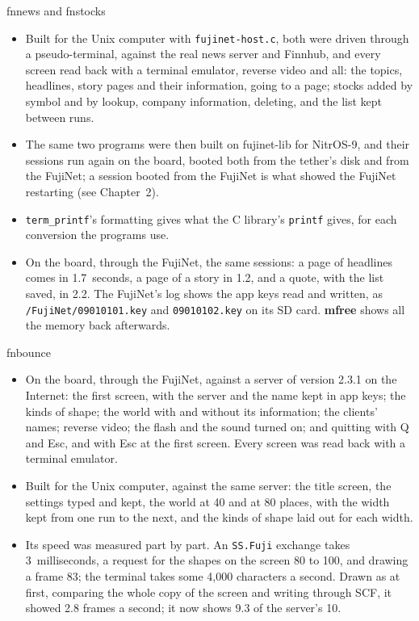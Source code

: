 \documentclass[10pt,twoside,openany]{book}
\makeatletter
\newcommand{\cmd}[1]{\textbf{#1}}            %
\newcommand{\file}[1]{\texttt{#1}}           %
\newcommand{\key}[1]{\textsf{\small #1}}     %
\renewcommand{\section}{\@startsection{section}{1}{0pt}{3.2ex plus 1ex}{1.2ex}%
  {\sffamily\bfseries\large}}
\makeatother
\begin{document}
\section{fnnews and fnstocks}

\begin{itemize}\setlength{\itemsep}{0.3ex}
\item Built for the Unix computer with \file{fujinet-host.c}, both were
driven through a pseudo-terminal, against the real news server and
Finnhub, and every screen read back with a terminal emulator, reverse
video and all: the topics, headlines, story pages and their information,
going to a page; stocks added by symbol and by lookup, company
information, deleting, and the list kept between runs.
\item The same two programs were then built on fujinet-lib for NitrOS-9,
and their sessions run again on the board, booted both from the tether's
disk and from the FujiNet; a session booted from the FujiNet is what
showed the FujiNet restarting (see Chapter~2).
\item \texttt{term\_printf}'s formatting gives what the C library's
\texttt{printf} gives, for each conversion the programs use.
\item On the board, through the FujiNet, the same sessions: a page of
headlines comes in 1.7~seconds, a page of a story in 1.2, and a quote,
with the list saved, in 2.2. The FujiNet's log shows the app keys read and
written, as \file{/FujiNet/09010101.key} and \file{09010102.key} on its
SD card. \cmd{mfree} shows all the memory back afterwards.
\end{itemize}

\section{fnbounce}

\begin{itemize}\setlength{\itemsep}{0.3ex}
\item On the board, through the FujiNet, against a server of version
2.3.1 on the Internet: the first screen, with the server and the name
kept in app keys; the kinds of shape; the world with and without its
information; the clients' names; reverse video; the flash and the sound
turned on; and quitting with \key{Q} and \key{Esc}, and with \key{Esc} at
the first screen. Every screen was read back with a terminal emulator.
\item Built for the Unix computer, against the same server: the title
screen, the settings typed and kept, the world at 40 and at 80 places,
with the width kept from one run to the next, and the kinds of shape laid
out for each width.
\item Its speed was measured part by part. An \texttt{SS.Fuji} exchange
takes 3~milliseconds, a request for the shapes on the screen 80 to 100,
and drawing a frame 83; the terminal takes some 4,000 characters a
second. Drawn as at first, comparing the whole copy of the screen and
writing through SCF, it showed 2.8 frames a second; it now shows 9.3 of
the server's 10.
\end{itemize}
\end{document}
